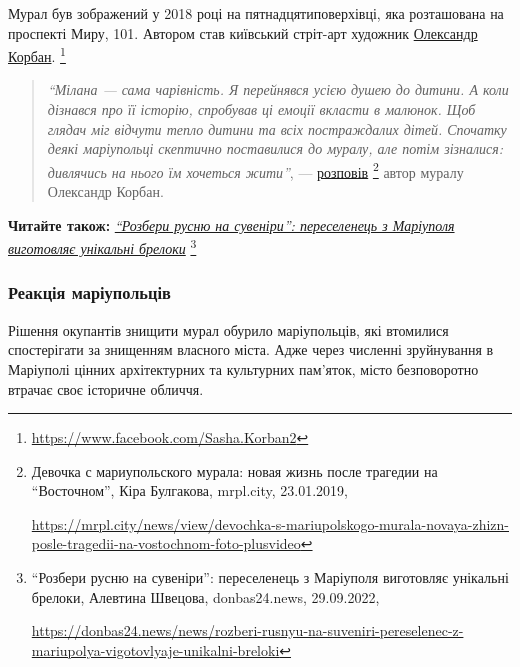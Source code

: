 
Мурал був зображений у 2018 році на пятнадцятиповерхівці, яка розташована на
проспекті Миру, 101. Автором став київський стріт-арт художник \href{https://www.facebook.com/Sasha.Korban2}{Олександр
Корбан}.%
\footnote{\url{https://www.facebook.com/Sasha.Korban2}}

\begin{quote}
\emph{\enquote{Мілана — сама чарівність. Я перейнявся усією душею до дитини. А коли
дізнався про її історію, спробував ці емоції вкласти в малюнок. Щоб глядач міг
відчути тепло дитини та всіх постраждалих дітей. Спочатку деякі маріупольці
скептично поставилися до муралу, але потім зізналися: дивлячись на нього їм
хочеться жити}}, — \href{https://mrpl.city/news/view/devochka-s-mariupolskogo-murala-novaya-zhizn-posle-tragedii-na-vostochnom-foto-plusvideo}{розповів}%
\footnote{Девочка с мариупольского мурала: новая жизнь после трагедии на \enquote{Восточном}, Кіра Булгакова, mrpl.city, 23.01.2019, \par\url{https://mrpl.city/news/view/devochka-s-mariupolskogo-murala-novaya-zhizn-posle-tragedii-na-vostochnom-foto-plusvideo}}
автор муралу Олександр Корбан.
\end{quote}


\textbf{Читайте також:} \href{https://donbas24.news/news/rozberi-rusnyu-na-suveniri-pereselenec-z-mariupolya-vigotovlyaje-unikalni-breloki}{\emph{\enquote{Розбери русню на сувеніри}: переселенець з Маріуполя виготовляє унікальні брелоки}}%
\footnote{\enquote{Розбери русню на сувеніри}: переселенець з Маріуполя виготовляє унікальні брелоки, Алевтина Швецова, donbas24.news, 29.09.2022, \par%
\url{https://donbas24.news/news/rozberi-rusnyu-na-suveniri-pereselenec-z-mariupolya-vigotovlyaje-unikalni-breloki}%
}

\subsubsection{Реакція маріупольців}

Рішення окупантів знищити мурал обурило маріупольців, які втомилися
спостерігати за знищенням власного міста. Адже через численні зруйнування в
Маріуполі цінних архітектурних та культурних пам'яток, місто безповоротно
втрачає своє історичне обличчя.

